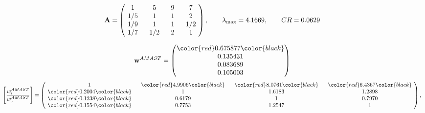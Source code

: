 \begin{example}
\begin{equation*}
\mathbf{A} =
\begin{pmatrix}
$\,\,$ 1 $\,\,$ & $\,\,$5$\,\,$ & $\,\,$9$\,\,$ & $\,\,$7 $\,\,$ \\
$\,\,$ 1/5$\,\,$ & $\,\,$ 1 $\,\,$ & $\,\,$1$\,\,$ & $\,\,$2 $\,\,$ \\
$\,\,$ 1/9$\,\,$ & $\,\,$ 1 $\,\,$ & $\,\,$ 1 $\,\,$ & $\,\,$ 1/2 $\,\,$ \\
$\,\,$ 1/7$\,\,$ & $\,\,$ 1/2$\,\,$ & $\,\,$2$\,\,$ & $\,\,$ 1  $\,\,$ \\
\end{pmatrix},
\qquad
\lambda_{\max} =
4.1669,
\qquad
CR = 0.0629
\end{equation*}

\begin{equation*}
\mathbf{w}^{AMAST} =
\begin{pmatrix}
\color{red} 0.675877\color{black} \\
0.135431\\
0.083689\\
0.105003
\end{pmatrix}\end{equation*}
\begin{equation*}
\left[ \frac{{w}^{AMAST}_i}{{w}^{AMAST}_j} \right] =
\begin{pmatrix}
$\,\,$ 1 $\,\,$ & $\,\,$\color{red} 4.9906\color{black} $\,\,$ & $\,\,$\color{red} 8.0761\color{black} $\,\,$ & $\,\,$\color{red} 6.4367\color{black} $\,\,$ \\
$\,\,$\color{red} 0.2004\color{black} $\,\,$ & $\,\,$ 1 $\,\,$ & $\,\,$1.6183$\,\,$ & $\,\,$1.2898  $\,\,$ \\
$\,\,$\color{red} 0.1238\color{black} $\,\,$ & $\,\,$0.6179$\,\,$ & $\,\,$ 1 $\,\,$ & $\,\,$0.7970 $\,\,$ \\
$\,\,$\color{red} 0.1554\color{black} $\,\,$ & $\,\,$0.7753$\,\,$ & $\,\,$1.2547$\,\,$ & $\,\,$ 1  $\,\,$ \\
\end{pmatrix},
\end{equation*}


\end{example}
